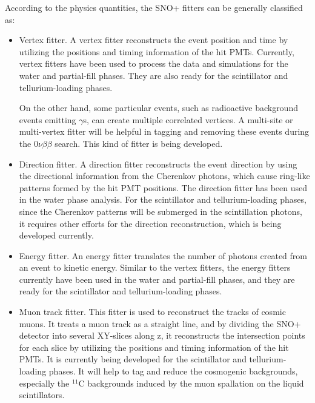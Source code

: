 According to the physics quantities, the SNO+ fitters can be generally classified as:
\begin{itemize}
	\item Vertex fitter. A vertex fitter reconstructs the event position and time by utilizing the positions and timing information of the hit PMTs. Currently, vertex fitters have been used to process the data and simulations for the water and partial-fill phases. They are also ready for the scintillator and tellurium-loading phases.
	
    On the other hand, some particular events, such as radioactive background events emitting $\gamma$s, can create multiple correlated vertices. A multi-site or multi-vertex fitter will be helpful in tagging and removing these events during the $0\nu\beta\beta$ search. This kind of fitter is being developed.

	\item Direction fitter. A direction fitter reconstructs the event direction by using the directional information from the Cherenkov photons, which cause ring-like patterns formed by the hit PMT positions. The direction fitter has been used in the water phase analysis. For the scintillator and tellurium-loading phases, since the Cherenkov patterns will be submerged in the scintillation photons, it requires other efforts for the direction reconstruction, which is being developed currently. 
	
	\item Energy fitter. An energy fitter translates the number of photons created from an event to kinetic energy. Similar to the vertex fitters, the energy fitters currently have been used in the water and partial-fill phases, and they are ready for the scintillator and tellurium-loading phases.

	\item Muon track fitter. This fitter is used to reconstruct the tracks of cosmic muons. It treats a muon track as a straight line, and by dividing the SNO+ detector into several XY-slices along z, it reconstructs the intersection points for each slice by utilizing the positions and timing information of the hit PMTs\cite{muonTrackRecon}. It is currently being developed for the scintillator and tellurium-loading phases. It will help to tag and reduce the cosmogenic backgrounds, especially the $^{11}$C backgrounds induced by the muon spallation on the liquid scintillators\cite{sorensen2016temperature}.
\end{itemize}

